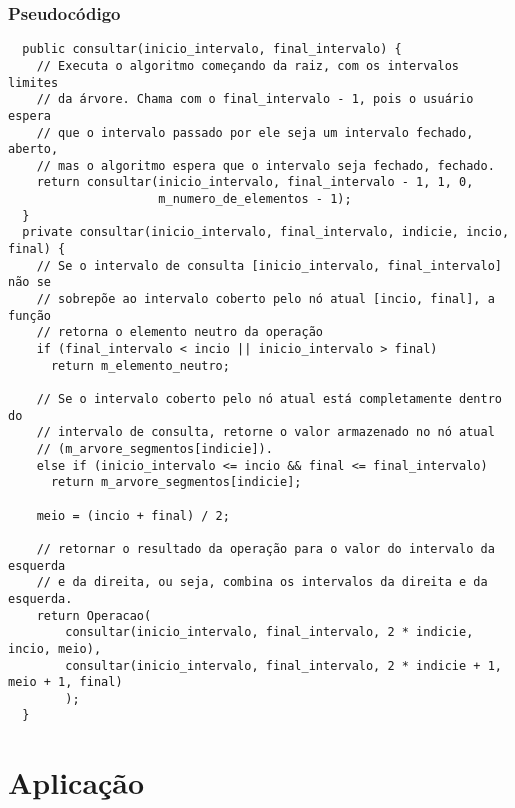 \documentclass{article}
\begin{document}
\subsubsection{Pseudocódigo}
\begin{verbatim}
  public consultar(inicio_intervalo, final_intervalo) {
    // Executa o algoritmo começando da raiz, com os intervalos limites 
    // da árvore. Chama com o final_intervalo - 1, pois o usuário espera
    // que o intervalo passado por ele seja um intervalo fechado, aberto,
    // mas o algoritmo espera que o intervalo seja fechado, fechado.
    return consultar(inicio_intervalo, final_intervalo - 1, 1, 0,
                     m_numero_de_elementos - 1);
  }
  private consultar(inicio_intervalo, final_intervalo, indicie, incio, final) {
    // Se o intervalo de consulta [inicio_intervalo, final_intervalo] não se 
    // sobrepõe ao intervalo coberto pelo nó atual [incio, final], a função 
    // retorna o elemento neutro da operação
    if (final_intervalo < incio || inicio_intervalo > final) 
      return m_elemento_neutro;

    // Se o intervalo coberto pelo nó atual está completamente dentro do 
    // intervalo de consulta, retorne o valor armazenado no nó atual 
    // (m_arvore_segmentos[indicie]).
    else if (inicio_intervalo <= incio && final <= final_intervalo) 
      return m_arvore_segmentos[indicie];

    meio = (incio + final) / 2; 

    // retornar o resultado da operação para o valor do intervalo da esquerda 
    // e da direita, ou seja, combina os intervalos da direita e da esquerda.
    return Operacao(
        consultar(inicio_intervalo, final_intervalo, 2 * indicie, incio, meio),
        consultar(inicio_intervalo, final_intervalo, 2 * indicie + 1, meio + 1, final)
        );
  }
\end{verbatim}

\section{Aplicação}
\end{document}
